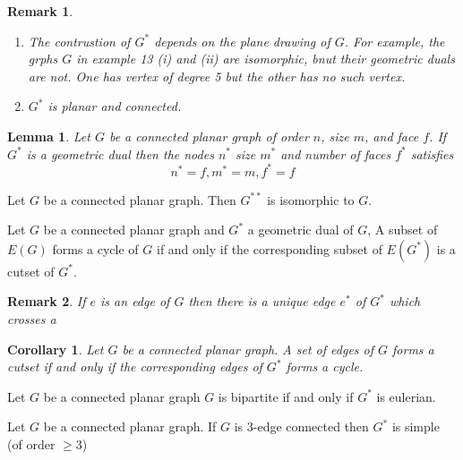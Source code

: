 \documentclass[12pt]{article}
\newenvironment{theorem}[1]{%
  \renewcommand\themanualtheoreminner{#1}%
  \manualtheoreminner
}{\endmanualtheoreminner}
\newtheorem*{corollary}{Corollary}
\newtheorem*{lemma}{Lemma}
\newtheorem*{remark}{Remark}
\begin{document}
\begin{remark}
  \begin{enumerate}
    \item The contrustion of $G^{*}$ depends on the plane drawing of $G$. For example, the grphs $G$ in example 13 (i) and (ii) are isomorphic, bnut their geometric duals are not.  One has vertex of degree 5 but the other has no such vertex.
    \item $G^{*}$ is planar and connected.
  \end{enumerate}
\end{remark}


\begin{lemma}
  Let $G$ be a connected planar graph of order $n$, size $m$, and face $f$. If $G^{*}$ is a geometric dual then the nodes $n^{*}$ size $m^{*}$ and number of faces $f^{*}$ satisfies
  \[n^{*} = f, m^{*} = m, f^{*} =f\]
\end{lemma}


\begin{theorem}{10}
Let $G$ be a connected planar graph. Then $G^{**}$ is isomorphic to $G$.
\end{theorem}

\begin{theorem}{11}
Let $G$ be a connected planar graph and $G^{*}$ a geometric dual of $G$, A subset of $E(G)$ forms a cycle of $G$ if and only if the corresponding subset of $E(G^{*})$ is a cutset of $G^{*}$.
\end{theorem}

\begin{remark}
If $e$ is an edge of $G$ then there is a unique edge $e^{*}$ of $G^{*}$ which crosses a
\end{remark}





\begin{corollary}
Let $G$ be a connected planar graph. A set of edges of $G$ forms a cutset if and only if the corresponding edges of $G^{*}$ forms a cycle.
\end{corollary}

\begin{theorem}{12}
Let $G$ be a connected planar graph $G$ is bipartite if and only if $G^{*}$ is eulerian.
\end{theorem}


\begin{theorem}{13}
Let $G$ be a connected planar graph. If $G$ is 3-edge connected then $G^{*}$ is simple (of order $\ge 3$)
\end{theorem}
\end{document}
